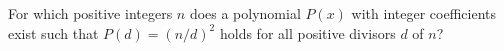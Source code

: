 For which positive integers $n$ does a polynomial $P(x)$ with integer coefficients
exist such that $P(d)=(n/d)^2$ holds for all positive divisors $d$ of $n$?